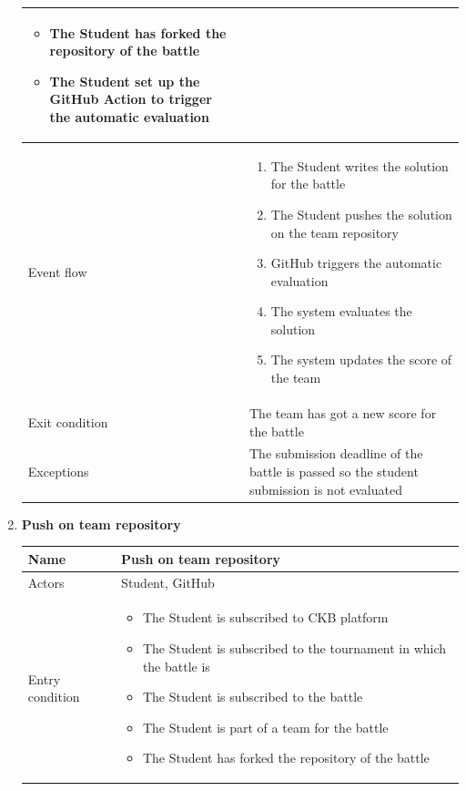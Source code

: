 \begin{enumerate}[label=UC\arabic*:]
\begin{tabular}{|p{3cm}|p{8cm}|}
\begin{itemize}
            \item The Student has forked the repository of the battle
            \item The Student set up the GitHub Action to trigger the automatic evaluation
        \end{itemize} \\
        \hline
        Event flow &
        \begin{enumerate}[label=\arabic*.]
            \item The Student writes the solution for the battle
            \item The Student pushes the solution on the team repository
            \item GitHub triggers the automatic evaluation
            \item The system evaluates the solution
            \item The system updates the score of the team
        \end{enumerate} \\
        \hline
        Exit condition & The team has got a new score for the battle \\
        \hline
        Exceptions & The submission deadline of the battle is passed so the student submission is not evaluated \\
        \hline
    \end{tabular}
    \item \textbf{Push on team repository} \\
    \begin{tabular}{|p{3cm}|p{8cm}|}
        \hline
        Name & Push on team repository \\
        \hline
        Actors & Student, GitHub \\
        \hline
        Entry condition &
        \begin{itemize}
            \item The Student is subscribed to CKB platform
            \item The Student is subscribed to the tournament in which the battle is
            \item The Student is subscribed to the battle
            \item The Student is part of a team for the battle
            \item The Student has forked the repository of the battle
        \end{itemize} \\
        \hline

\end{tabular}
\end{enumerate}

